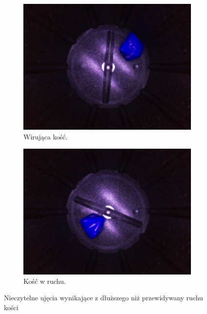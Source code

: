 \begin{figure}[H]
    \centering
    \begin{subfigure}[t]{0.45\linewidth}
        \centering
        \includegraphics[width=\linewidth]{chapters/04-czytanie/figures/wir}
        \caption{Wirująca kość.}
        \label{fig:wir}
    \end{subfigure}
    \hfill
    \begin{subfigure}[t]{0.45\linewidth}
        \centering
        \includegraphics[width=\linewidth]{chapters/04-czytanie/figures/wir2}
        \caption{Kość w ruchu.}
        \label{fig:wir2}
    \end{subfigure}
    \caption{Nieczytelne ujęcia wynikające z dłuższego niż przewidywany ruchu kości}
    \label{fig:wircombined}
\end{figure}


